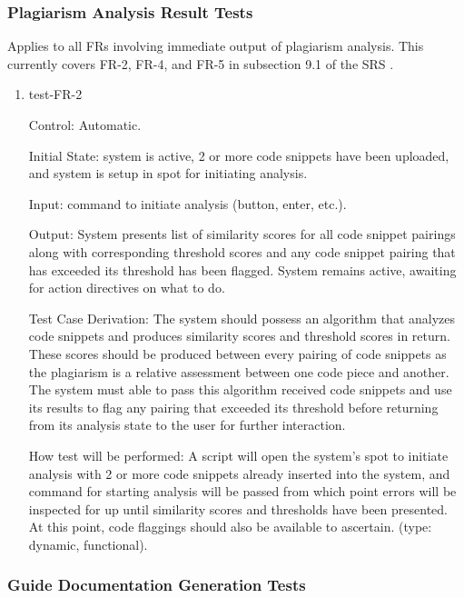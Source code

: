 \documentclass[12pt, titlepage]{article}
\begin{document}
\subsubsection{Plagiarism Analysis Result Tests}

Applies to all FRs involving immediate output of plagiarism analysis. This 
currently covers FR-2, FR-4, and FR-5 in subsection 9.1 of the SRS \citep{SRS}.

\begin{enumerate}

\item{test-FR-2\\}

Control: Automatic.
					
Initial State: system is active, 2 or more code snippets have been uploaded,
and system is setup in spot for initiating analysis.
					
Input: command to initiate analysis (button, enter, etc.).
					
Output: System presents list of similarity scores for all code snippet pairings 
along  with corresponding threshold scores and any code snippet pairing that 
has exceeded its threshold has been flagged. System remains active, 
awaiting for action directives on what to do.

Test Case Derivation: The system should possess an algorithm that analyzes code 
snippets and produces similarity scores and threshold scores in return. These 
scores should be produced between every pairing of code snippets as the 
plagiarism is a relative assessment between one code piece and another. The 
system must able to pass this algorithm received code snippets and use its
results to flag any pairing that exceeded its threshold before returning from
its analysis state to the user for further interaction.

How test will be performed: A script will open the system's spot to initiate analysis 
with 2 or more code snippets already inserted into the system, and command for 
starting analysis will be passed from which point errors will be inspected for 
up until similarity scores and thresholds have been presented. At this point,
code flaggings should also be available to ascertain. (type: dynamic, functional).
					

\end{enumerate}

\subsubsection{Guide Documentation Generation Tests}
\end{document}
